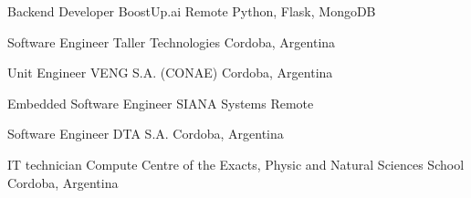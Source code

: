     {Backend Developer} %
    {BoostUp.ai} %
    {Remote} %
    {}
    {Python, Flask, MongoDB}

    {Software Engineer} %
    {Taller Technologies} %
    {Cordoba, Argentina} %
    {}
    {}

    {Unit Engineer} %
    {VENG S.A. (CONAE)} %
    {Cordoba, Argentina} %
    {}
    {}

    {Embedded Software Engineer} %
    {SIANA Systems} %
    {Remote} %
    {}
    {}

    {Software Engineer} %
    {DTA S.A.} %
    {Cordoba, Argentina} %
    {}
    {}

    {IT technician} %
    {Compute Centre of the Exacts, Physic and Natural Sciences School} %
    {Cordoba, Argentina} %
    {}
    {}

